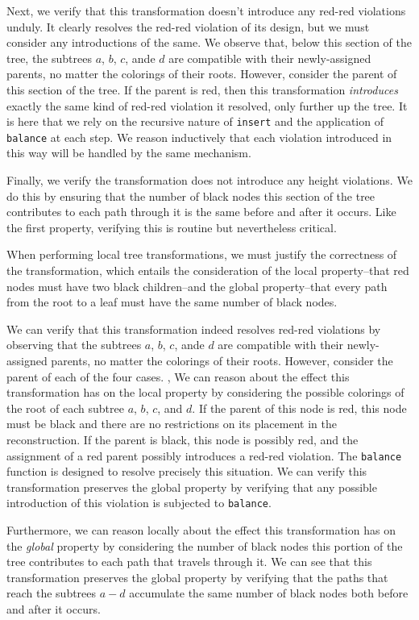 \documentclass[preprint]{sigplanconf}
\begin{document}
Next, we verify that this transformation doesn't introduce any red-red violations unduly. It clearly resolves the red-red violation of its design, but we must consider any introductions of the same. We observe that, below this section of the tree, the subtrees $a$, $b$, $c$, ande $d$ are compatible with their newly-assigned parents, no matter the colorings of their roots. However, consider the parent of this section of the tree. If the parent is red, then this transformation \emph{introduces} exactly the same kind of red-red violation it resolved, only further up the tree. It is here that we rely on the recursive nature of \texttt{insert} and the application of \texttt{balance} at each step. We reason inductively that each violation introduced in this way will be handled by the same mechanism.

Finally, we verify the transformation does not introduce any height violations. We do this by ensuring that the number of black nodes this section of the tree contributes to each path through it is the same before and after it occurs. Like the first property, verifying this is routine but nevertheless critical.

When performing local tree transformations, we must justify the correctness of the transformation, which entails the consideration of the local property--that red nodes must have two black children--and the global property--that every path from the root to a leaf must have the same number of black nodes.

We can verify that this transformation indeed resolves red-red violations by observing that the subtrees $a$, $b$, $c$, ande $d$ are compatible with their newly-assigned parents, no matter the colorings of their roots. However, consider the parent of each of the four cases. , 
We can reason about the effect this transformation has on the local property by considering the possible colorings of the root of each subtree $a$, $b$, $c$, and $d$. If the parent of this node is red, this node must be black and there are no restrictions on its placement in the reconstruction. If the parent is black, this node is possibly red, and the assignment of a red parent possibly introduces a red-red violation. The \texttt{balance} function is designed to resolve precisely this situation. We can verify this transformation preserves the global property by verifying that any possible introduction of this violation is subjected to \texttt{balance}.

Furthermore, we can reason locally about the effect this transformation has on the \emph{global} property by considering the number of black nodes this portion of the tree contributes to each path that travels through it. We can see that this transformation preserves the global property by verifying that the paths that reach the subtrees $a-d$ accumulate the same number of black nodes both before and after it occurs.
\end{document}
